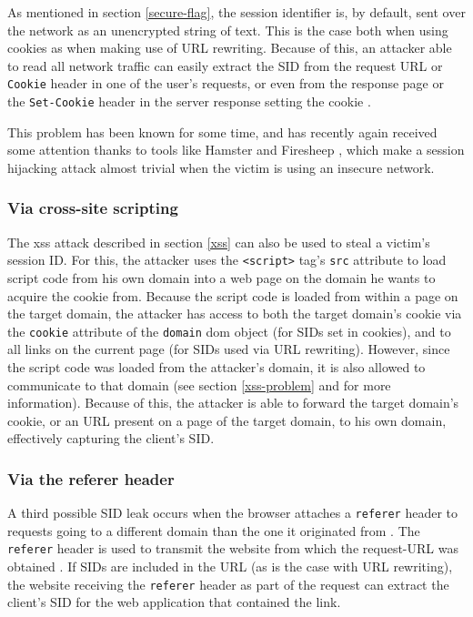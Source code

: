 As mentioned in section \ref{secure-flag}, the session identifier is, by default, sent over the network as an unencrypted string of text. This is the case both when using cookies as when making use of URL rewriting. Because of this, an attacker able to read all network traffic can easily extract the SID from the request URL or \texttt{Cookie} header in one of the user's requests, or even from the response page or the \texttt{Set-Cookie} header in the server response setting the cookie \cite{Adida2008}.

This problem has been known for some time, and has recently again received some attention thanks to tools like Hamster \cite{Graham2007} and Firesheep \cite{Butler2010}, which make a session hijacking attack almost trivial when the victim is using an insecure network.

\subsubsection{Via cross-site scripting}

The \gls{xss} attack described in section \ref{xss} can also be used to steal a victim's session ID. For this, the attacker uses the \texttt{<script>} tag's \texttt{src} attribute to load script code from his own domain into a web page on the domain he wants to acquire the cookie from. Because the script code is loaded from within a page on the target domain, the attacker has access to both the target domain's cookie via the \texttt{cookie} attribute of the \texttt{domain} \gls{dom} object (for SIDs set in cookies), and to all links on the current page (for SIDs used via URL rewriting). However, since the script code was loaded from the attacker's domain, it is also allowed to communicate to that domain (see section \ref{xss-problem} and \cite{Klein2002} for more information). Because of this, the attacker is able to forward the target domain's cookie, or an URL present on a page of the target domain, to his own domain, effectively capturing the client's SID.

\subsubsection{Via the referer header}

A third possible SID leak occurs when the browser attaches a \texttt{referer} header to requests going to a different domain than the one it originated from \cite{Fu2001}. The \texttt{referer} header is used to transmit the website from which the request-URL was obtained \cite{rfc2616}. If SIDs are included in the URL (as is the case with URL rewriting), the website receiving the \texttt{referer} header as part of the request can extract the client's SID for the web application that contained the link.

